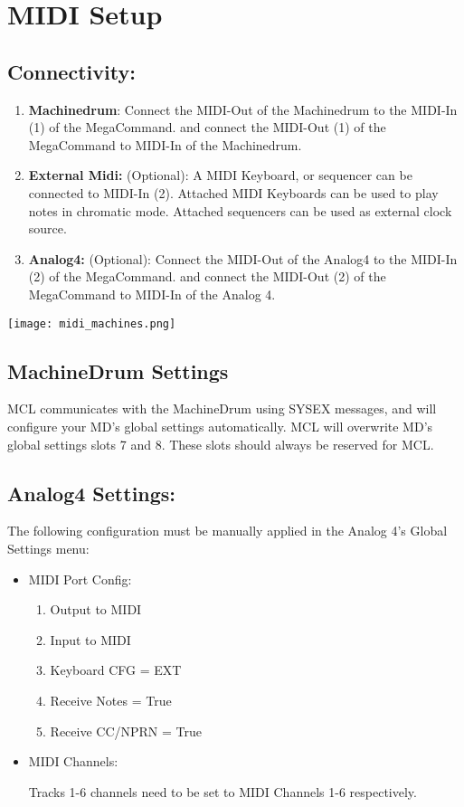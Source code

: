 \chapter{MIDI Setup}
\section{Connectivity:}

\begin{enumerate}
\item\textbf{Machinedrum}:
Connect the MIDI-Out of the Machinedrum to the MIDI-In (1) of the MegaCommand. and connect the MIDI-Out (1) of the MegaCommand to MIDI-In of the Machinedrum.

\item\textbf{External Midi:} (Optional): 
A MIDI Keyboard, or sequencer can be connected to MIDI-In (2). Attached MIDI Keyboards can be used to play notes in chromatic mode. Attached sequencers can be used as external clock source.

\item\textbf{Analog4:} (Optional):
Connect the MIDI-Out of the Analog4 to the MIDI-In (2) of the MegaCommand. and connect the MIDI-Out (2) of the MegaCommand to MIDI-In of the Analog 4.
\end{enumerate}
\texttt{[image: midi\_machines.png]}
\\
\section{MachineDrum Settings }

MCL communicates with the MachineDrum using SYSEX messages, and will configure your MD's global settings automatically. MCL will overwrite MD's global settings slots 7 and 8. These slots should always be reserved for MCL.

\section{Analog4 Settings:}

The following configuration must be manually applied in the Analog 4's Global Settings menu:

\begin{itemize}

\item{MIDI Port Config:}
\begin{enumerate}
\item{Output to MIDI}
\item{Input to MIDI}
\item{Keyboard CFG = EXT}
\item{Receive Notes = True}
\item{Receive CC/NPRN = True}
\end{enumerate}
\item{MIDI Channels:}

Tracks 1-6 channels need to be set to MIDI Channels 1-6 respectively.

\end{itemize}

